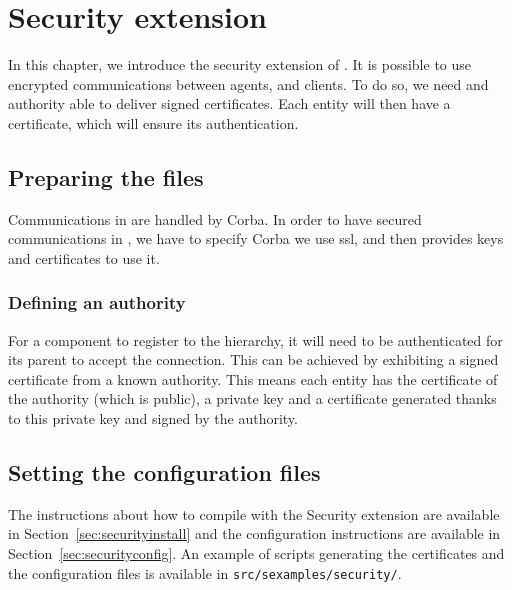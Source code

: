 
\chapter{Security extension}
\label{ch:Securityextension}

In this chapter, we introduce the security extension of \diet. It is 
possible to use encrypted communications between agents, \seds and clients. 
To do so, we need and authority able to deliver signed certificates. Each 
entity will then have a certificate, which will ensure its authentication.

\section{Preparing the files}

Communications in \diet are handled by Corba. In order to have secured 
communications in \diet, we have to specify Corba we use ssl, and then 
provides keys and certificates to use it.

\subsection{Defining an authority}

For a component to register to the \diet hierarchy, it will need to be 
authenticated for its parent to accept the connection. This can be achieved 
by exhibiting a signed certificate from a known authority. This means each
entity has the certificate of the authority (which is public), a private key and
a certificate generated thanks to this private key and signed by the authority.

\section{Setting the configuration files}

The instructions about how to compile \diet with the Security extension are 
available in Section~\ref{sec:securityinstall} and the configuration 
instructions are available in Section~\ref{sec:securityconfig}.
An example of scripts generating the certificates and the configuration
files is available in \verb+src/sexamples/security/+.



